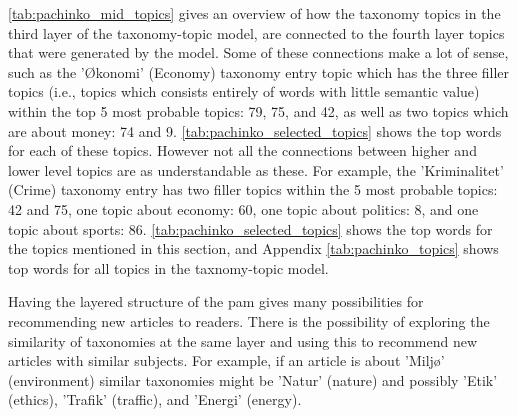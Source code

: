\autoref{tab:pachinko_mid_topics} gives an overview of how the taxonomy topics in the third layer of the taxonomy-topic model, are connected to the fourth layer topics that were generated by the model.
Some of these connections make a lot of sense, such as the 'Økonomi' (Economy) taxonomy entry topic which has the three filler topics (i.e., topics which consists entirely of words with little semantic value) within the top 5 most probable topics: 79, 75, and 42, as well as two topics which are about money: 74 and 9.
\autoref{tab:pachinko_selected_topics} shows the top words for each of these topics.
However not all the connections between higher and lower level topics are as understandable as these. 
For example, the 'Kriminalitet' (Crime) taxonomy entry has two filler topics within the 5 most probable topics: 42 and 75, one topic about economy: 60, one topic about politics: 8, and one topic about sports: 86.
\autoref{tab:pachinko_selected_topics} shows the top words for the topics mentioned in this section, and Appendix \autoref{tab:pachinko_topics} shows top words for all topics in the taxnomy-topic model.

Having the layered structure of the \gls{pam} gives many possibilities for recommending new articles to readers.
There is the possibility of exploring the similarity of taxonomies at the same layer and using this to recommend new articles with similar subjects.
For example, if an article is about 'Miljø' (environment) similar taxonomies might be 'Natur' (nature) and possibly 'Etik' (ethics), 'Trafik' (traffic), and 'Energi' (energy).

